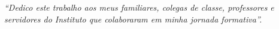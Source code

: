 \begin{flushright}
\begin{minipage}[r]{10cm}
\vspace{18cm}
\textit{
``Dedico este trabalho aos meus familiares, colegas de classe, professores e servidores do Instituto que colaboraram em minha jornada formativa''.
}
\end{minipage}
\end{flushright}